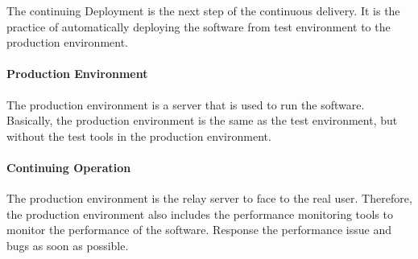 The continuing Deployment is the next step of the continuous delivery.
It is the practice of automatically deploying the software from test environment
to the production environment.

\paragraph{Production Environment}
The production environment is a server that is used to run the software. 
Basically, the production environment is the same as the test environment,
but without the test tools in the production environment.

\paragraph{Continuing Operation}
The production environment is the relay server to face to the real user.
Therefore, the production environment also includes the performance monitoring tools
to monitor the performance of the software. Response the performance issue and bugs
as soon as possible.

